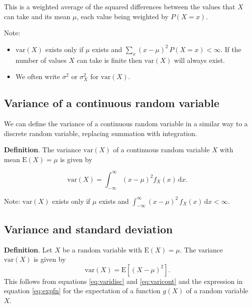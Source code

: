 \documentclass[
  british,
]{book}
\providecommand{\tightlist}{%
  \setlength{\itemsep}{0pt}\setlength{\parskip}{0pt}}
\begin{document}
This is a weighted average of the squared differences between the values that \(X\) can take and its mean \(\mu\), each value being weighted by \(P(X=x)\).

Note:

\begin{itemize}
\tightlist
\item
  \(\mathrm{var}(X)\) exists only if \(\mu\) exists and \(\sum_x (x-\mu)^2\,P(X=x) < \infty\). If the number of values \(X\) can take is finite then \(\mathrm{var}(X)\) will always exist.
\item
  We often write \(\sigma^2\) or \(\sigma_X^2\) for \(\mathrm{var}(X)\).
\end{itemize}

\hypertarget{variance-of-a-continuous-random-variable}{%
\subsection{Variance of a continuous random variable}\label{variance-of-a-continuous-random-variable}}

We can define the variance of a continuous random variable in a similar way to a discrete random variable, replacing summation with integration.

\textbf{Definition}. The variance \(\mathrm{var}(X)\) of a continuous random variable \(X\) with mean \(\mathrm{E}(X)=\mu\) is given by

\begin{equation}
\mathrm{var}(X) = \int_{-\infty}^{\infty} (x-\mu)^2 f_X(x) \,\mathrm{d}x. 
\label{eq:varicont}
\end{equation}

Note: \(\mathrm{var}(X)\) exists only if \(\mu\) exists and \(\int_{-\infty}^{\infty} (x-\mu)^2\,f_X(x) \,\mathrm{d}x < \infty\).

\hypertarget{variance-and-standard-deviation}{%
\subsection{Variance and standard deviation}\label{variance-and-standard-deviation}}

\textbf{Definition}. Let \(X\) be a random variable with \(\mathrm{E}(X)=\mu\). The variance \(\mathrm{var}(X)\) is given by
\[ \mathrm{var}(X) = \mathrm{E}\left[(X-\mu)^2\right]. \]
This follows from equations \eqref{eq:varidisc} and \eqref{eq:varicont} and the expression in equation \eqref{eq:expfn} for the expectation of a function \(g(X)\) of a random variable \(X\).
\end{document}
